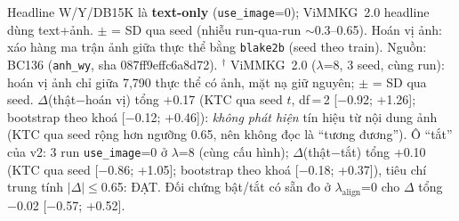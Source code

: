 \begin{table}[t]
\vspace{2pt}
\begin{minipage}{\linewidth}\footnotesize\raggedright
Headline W/Y/DB15K là \textbf{text-only} (\texttt{use\_image}=0); ViMMKG~2.0 headline dùng
text+ảnh. $\pm$ = SD qua seed (nhiễu run-qua-run $\sim$0.3--0.65). Hoán vị ảnh: xáo hàng ma trận
ảnh giữa thực thể bằng \texttt{blake2b} (seed theo train). Nguồn: BC136 (\texttt{anh\_wy}, sha
087ff9effc6a8d72).
$^{\dagger}$ ViMMKG~2.0 ($\lambda$=8, 3 seed, cùng run): hoán vị ảnh chỉ giữa 7{,}790 thực thể có ảnh, mặt nạ giữ nguyên; $\pm$ = SD qua seed. $\Delta$(thật$-$hoán vị) tổng +0.17 (KTC qua seed $t$, df\,=\,2 [$-$0.92; +1.26]; bootstrap theo khoá [$-$0.12; +0.46]): \emph{không phát hiện} tín hiệu từ nội dung ảnh (KTC qua seed rộng hơn ngưỡng 0.65, nên không đọc là ``tương đương''). Ô ``tắt'' của v2: 3 run \texttt{use\_image}=0 ở $\lambda$=8 (cùng cấu hình); $\Delta$(thật$-$tắt) tổng +0.10 (KTC qua seed [$-$0.86; +1.05]; bootstrap theo khoá [$-$0.18; +0.37]), tiêu chí trung tính $|\Delta|\le$0.65: ĐẠT. Đối chứng bật/tắt có sẵn đo ở $\lambda_{\text{align}}$=0 cho $\Delta$ tổng $-$0.02 [$-$0.57; +0.52].
\end{minipage}
\end{table}
